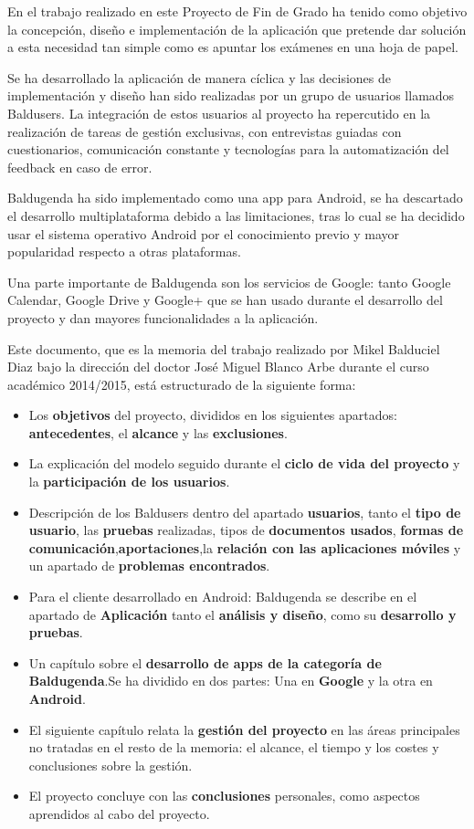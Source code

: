 En el trabajo realizado en este Proyecto de Fin de Grado ha tenido como objetivo la concepción, diseño e implementación de la aplicación que pretende dar solución a esta necesidad tan simple como es apuntar los exámenes en una hoja de papel.

Se ha desarrollado la aplicación de manera cíclica y las decisiones de implementación y diseño han sido realizadas por un grupo de usuarios llamados \glspl{Balduser}. La integración de estos usuarios al proyecto ha repercutido en la realización de tareas de gestión exclusivas, con entrevistas guiadas con cuestionarios, comunicación constante y tecnologías para la automatización del feedback en caso de error.

\gls{Baldugenda} ha sido implementado como una app para Android, se ha descartado el desarrollo multiplataforma debido a las limitaciones, tras lo cual se ha decidido usar el sistema operativo Android por el conocimiento previo y mayor popularidad respecto a otras plataformas.

Una parte importante de Baldugenda son los servicios de Google: tanto Google Calendar, Google Drive y Google+ que se han usado durante el desarrollo del proyecto y dan mayores funcionalidades a la aplicación.

Este documento, que es la memoria del trabajo realizado por Mikel Balduciel Diaz
bajo la dirección del doctor José Miguel Blanco Arbe durante el curso académico 2014/2015, está estructurado de la siguiente forma:

\begin{itemize}
	\item Los \textbf{objetivos} del proyecto, divididos en los siguientes apartados: \textbf{antecedentes}, el \textbf{alcance} y las \textbf{exclusiones}.
	\item La explicación del modelo seguido durante el \textbf{ciclo de vida del proyecto} y la \textbf{participación de los usuarios}.
	\item Descripción de los Baldusers dentro del apartado \textbf{usuarios}, tanto el \textbf{tipo de usuario}, las \textbf{pruebas} realizadas, tipos de \textbf{documentos usados}, \textbf{formas de comunicación},\textbf{aportaciones},la \textbf{relación con las aplicaciones móviles} y un apartado de \textbf{problemas encontrados}.
	\item Para el cliente desarrollado en Android: Baldugenda se describe en el apartado de \textbf{Aplicación} tanto el \textbf{análisis y diseño}, como su \textbf{desarrollo y pruebas}.
	\item Un capítulo sobre el \textbf{desarrollo de apps de la categoría de Baldugenda}.Se ha dividido en dos partes: Una en \textbf{Google} y la otra en \textbf{Android}.
	\item El siguiente capítulo relata la \textbf{gestión del proyecto} en las áreas principales no tratadas en el resto de la memoria: el alcance, el tiempo y los costes y conclusiones sobre la gestión.
	\item El proyecto concluye con las \textbf{conclusiones} personales, como aspectos aprendidos al cabo del proyecto.
\end{itemize}

